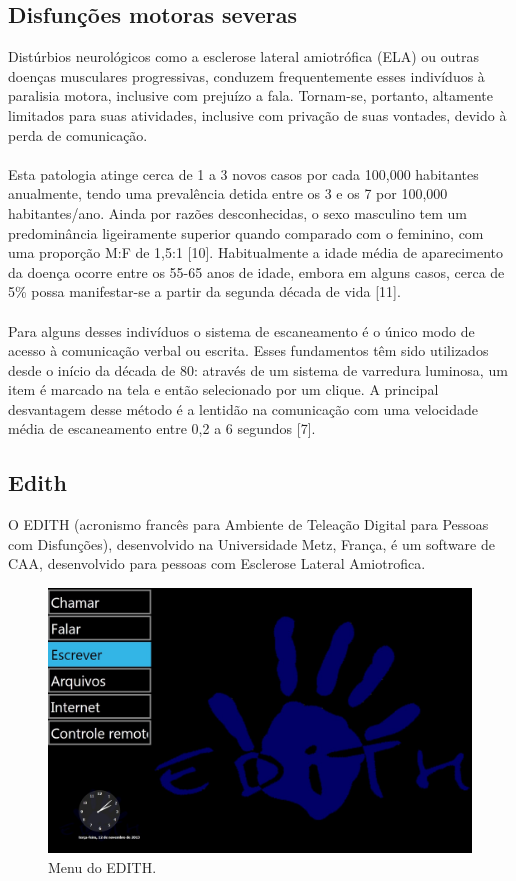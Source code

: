 \documentclass[twoside]{article}
\begin{document}
\begin{multicols}{2}
\subsection{Disfunções motoras severas}
Distúrbios neurológicos como a esclerose lateral amiotrófica (ELA) ou outras doenças musculares progressivas, conduzem frequentemente esses indivíduos à paralisia motora, inclusive com prejuízo a fala. Tornam-se, portanto, altamente limitados para suas atividades, inclusive com privação de suas vontades, devido à perda de comunicação.
\\\\
Esta patologia atinge cerca de 1 a 3 novos casos por cada 100,000 habitantes anualmente, tendo uma prevalência detida entre os 3 e os 7 por 100,000 habitantes/ano. Ainda por razões desconhecidas, o sexo masculino tem um predominância ligeiramente superior quando comparado com o feminino, com uma proporção M:F de 1,5:1 [10]. Habitualmente a idade média de aparecimento da doença ocorre entre os 55-65 anos de idade, embora em  alguns casos, cerca de 5\% possa manifestar-se a partir da segunda década de vida [11].
\\\\
Para alguns desses indivíduos o sistema de escaneamento é o único modo de acesso à comunicação verbal ou escrita. Esses fundamentos têm sido utilizados desde o início da década de 80: através de um sistema de varredura luminosa, um item é marcado na tela e então selecionado por um clique. A principal desvantagem desse método é a lentidão na comunicação com uma velocidade média de escaneamento entre 0,2 a 6 segundos [7].

\subsection{Edith}
O EDITH (acronismo francês para Ambiente de Teleação Digital para Pessoas com Disfunções), desenvolvido na Universidade Metz, França, é um software de CAA, desenvolvido para pessoas com Esclerose Lateral Amiotrofica.

\begin{figure}[H]
\label{fig:edith_menu}
  \caption{Menu do EDITH.}
  \centering
    \includegraphics[scale = 0.18]{edith_menu.png}
\end{figure}


\end{multicols}
\end{document}
